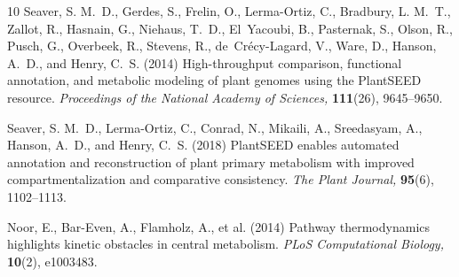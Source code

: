 \documentclass[unnumsec,webpdf,modern,large]{oup-authoring-template}
\begin{document}
\begin{thebibliography}{10}
Seaver, S. M.~D., Gerdes, S., Frelin, O., Lerma-Ortiz, C., Bradbury, L. M.~T.,
  Zallot, R., Hasnain, G., Niehaus, T.~D., El~Yacoubi, B., Pasternak, S.,
  Olson, R., Pusch, G., Overbeek, R., Stevens, R., de~Cr\'ecy-Lagard, V., Ware,
  D., Hanson, A.~D., and Henry, C.~S. (2014)
High-throughput comparison, functional annotation, and metabolic modeling of
  plant genomes using the {PlantSEED} resource.
{\em Proceedings of the National Academy of Sciences,} {\bf 111}(26),
  9645--9650.

Seaver, S. M.~D., Lerma-Ortiz, C., Conrad, N., Mikaili, A., Sreedasyam, A.,
  Hanson, A.~D., and Henry, C.~S. (2018)
{PlantSEED} enables automated annotation and reconstruction of plant primary
  metabolism with improved compartmentalization and comparative consistency.
{\em The Plant Journal,} {\bf 95}(6), 1102--1113.

Noor, E., Bar-Even, A., Flamholz, A., et al. (2014)
Pathway thermodynamics highlights kinetic obstacles in central metabolism.
{\em PLoS Computational Biology,} {\bf 10}(2), e1003483.

\end{thebibliography}
\end{document}
